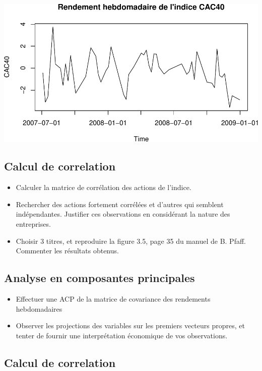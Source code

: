 \documentclass[
]{article}
\providecommand{\tightlist}{%
  \setlength{\itemsep}{0pt}\setlength{\parskip}{0pt}}
\begin{document}
\includegraphics{TP1_files/figure-latex/plot-cac-2-1.pdf}

\hypertarget{calcul-de-correlation}{%
\subsection{Calcul de correlation}\label{calcul-de-correlation}}

\begin{itemize}
\item
  Calculer la matrice de corrélation des actions de l'indice.
\item
  Rechercher des actions fortement corrélées et d'autres qui semblent
  indépendantes. Justifier ces observations en considérant la nature des
  entreprises.
\item
  Choisir 3 titres, et reproduire la figure 3.5, page 35 du manuel de B.
  Pfaff. Commenter les résultats obtenus.
\end{itemize}

\hypertarget{analyse-en-composantes-principales}{%
\subsection{Analyse en composantes
principales}\label{analyse-en-composantes-principales}}

\begin{itemize}
\tightlist
\item
  Effectuer une ACP de la matrice de covariance des rendements
  hebdomadaires
\item
  Observer les projections des variables sur les premiers vecteurs
  propres, et tenter de fournir une interprétation économique de vos
  observations.
\end{itemize}

\hypertarget{calcul-de-correlation-1}{%
\subsection{Calcul de correlation}\label{calcul-de-correlation-1}}
\end{document}

